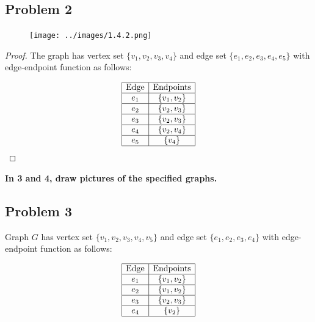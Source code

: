 \documentclass[14pt]{extarticle}
\begin{document}
\subsection{Problem 2}

\begin{figure}[ht!]
    \centering
    \texttt{[image: ../images/1.4.2.png]}
\end{figure}

\begin{proof}
    The graph has vertex set $\{v_1, v_2, v_3, v_4\}$ and edge set
    $\{e_1, e_2, e_3, e_4, e_5\}$ with edge-endpoint function as follows:

    $$
        \begin{array}{|c|c|}
            \hline
            \text{Edge} & \text{Endpoints} \\
            \hline
            e_1         & \{v_1, v_2\}     \\
            \hline
            e_2         & \{v_2, v_3\}     \\
            \hline
            e_3         & \{v_2, v_3\}     \\
            \hline
            e_4         & \{v_2, v_4\}     \\
            \hline
            e_5         & \{v_4\}          \\
            \hline
        \end{array}
    $$
\end{proof}

{\bf In 3 and 4, draw pictures of the specified graphs.}

\subsection{Problem 3}
Graph $G$ has vertex set $\{v_1, v_2, v_3, v_4, v_5\}$ and edge set $\{e_1,
    e_2, e_3, e_4\}$ with edge-endpoint function as follows:

$$
    \begin{array}{|c|c|}
        \hline
        \text{Edge} & \text{Endpoints} \\
        \hline
        e_1         & \{v_1, v_2\}     \\
        \hline
        e_2         & \{v_1, v_2\}     \\
        \hline
        e_3         & \{v_2, v_3\}     \\
        \hline
        e_4         & \{v_2\}          \\
        \hline
    \end{array}
$$
\end{document}
